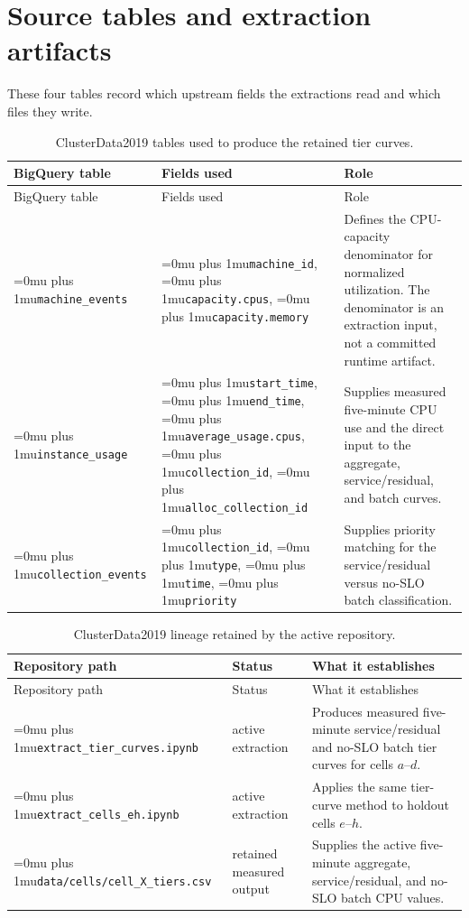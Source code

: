 \documentclass[conference]{IEEEtran}
\newcommand{\codepath}[1]{{\Urlmuskip=0mu plus 1mu\relax\nolinkurl{#1}}}
\begin{document}
\appendices
\onecolumn
\section{Source tables and extraction artifacts}
\label{app:source-tables}

These four tables record which upstream fields the extractions read and which files they write.

\begin{longtable}{@{}L{0.20\textwidth}L{0.32\textwidth}L{0.40\textwidth}@{}}
  \caption{ClusterData2019 tables used to produce the retained tier curves.}
  \label{tab:clusterdata-upstream-fields}\\
  \toprule
  BigQuery table & Fields used & Role \\
  \midrule
  \endfirsthead
  \toprule
  BigQuery table & Fields used & Role \\
  \midrule
  \endhead
  \codepath{machine_events}
    & \codepath{machine_id}, \codepath{capacity.cpus},
      \codepath{capacity.memory}
    & Defines the CPU-capacity denominator for normalized utilization. The
      denominator is an extraction input, not a committed runtime artifact. \\
  \codepath{instance_usage}
    & \codepath{start_time}, \codepath{end_time},
      \codepath{average_usage.cpus}, \codepath{collection_id},
      \codepath{alloc_collection_id}
    & Supplies measured five-minute CPU use and the direct input to the
      aggregate, service/residual, and batch curves. \\
  \codepath{collection_events}
    & \codepath{collection_id}, \codepath{type}, \codepath{time},
      \codepath{priority}
    & Supplies priority matching for the service/residual versus no-SLO batch
      classification. \\
  \bottomrule
\end{longtable}

\begin{longtable}{@{}L{0.34\textwidth}L{0.19\textwidth}L{0.39\textwidth}@{}}
  \caption{ClusterData2019 lineage retained by the active repository.}
  \label{tab:clusterdata-artifact-lineage}\\
  \toprule
  Repository path & Status & What it establishes \\
  \midrule
  \endfirsthead
  \toprule
  Repository path & Status & What it establishes \\
  \midrule
  \endhead
  \codepath{extract_tier_curves.ipynb}
    & active extraction
    & Produces measured five-minute service/residual and no-SLO batch tier curves
      for cells \(a\)--\(d\). \\
  \codepath{extract_cells_eh.ipynb}
    & active extraction
    & Applies the same tier-curve method to holdout cells \(e\)--\(h\). \\
  \codepath{data/cells/cell_X_tiers.csv}
    & retained measured output
    & Supplies the active five-minute aggregate, service/residual, and no-SLO
      batch CPU values. \\
  \bottomrule
\end{longtable}
\end{document}
